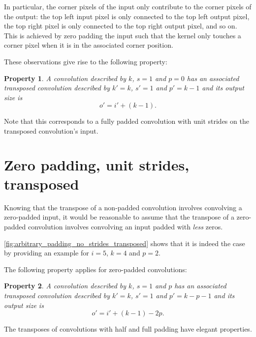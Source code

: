 \documentclass{report}
\newtheorem{prop}{Property}
\begin{document}
In particular, the corner pixels of the input only contribute to the corner
pixels of the output: the top left input pixel is only connected to the top left
output pixel, the top right pixel is only connected to the top right output
pixel, and so on. This is achieved by zero padding the input such that the
kernel only touches a corner pixel when it is in the associated corner position.

These observations give rise to the following property:

\begin{prop}\label{prop:no_padding_no_strides_transposed}
A convolution described by $k$, $s = 1$ and $p = 0$ has an associated transposed
convolution described by $k' = k$, $s' = 1$ and $p' = k - 1$ and its output size
is
\begin{equation*}
    o' = i' + (k - 1).
\end{equation*}
\end{prop}

Note that this corresponds to a fully padded convolution with unit strides on
the transposed convolution's input.

\section{Zero padding, unit strides, transposed}

Knowing that the transpose of a non-padded convolution involves convolving a
zero-padded input, it would be reasonable to assume that the transpose of a
zero-padded convolution involves convolving an input padded with {\em less}
zeros.

\autoref{fig:arbitrary_padding_no_strides_transposed} shows that it is indeed
the case by providing an example for $i = 5$, $k = 4$ and $p = 2$.

The following property applies for zero-padded convolutions:

\begin{prop}\label{prop:arbitrary_padding_no_strides_transposed}
A convolution described by $k$, $s = 1$ and $p$ has an associated transposed
convolution described by $k' = k$, $s' = 1$ and $p' = k - p - 1$ and its output
size is
\begin{equation*}
    o' = i' + (k - 1) - 2p.
\end{equation*}
\end{prop}

The transposes of convolutions with half and full padding have elegant
properties.
\end{document}
